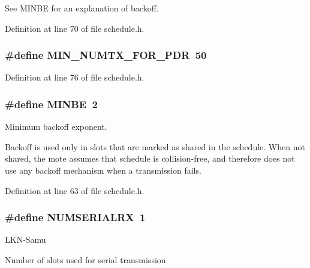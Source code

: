 See M\+I\+N\+BE for an explanation of backoff. 

Definition at line 70 of file schedule.\+h.

\subsubsection[{\texorpdfstring{M\+I\+N\+\_\+\+N\+U\+M\+T\+X\+\_\+\+F\+O\+R\+\_\+\+P\+DR}{MIN_NUMTX_FOR_PDR}}]{\setlength{\rightskip}{0pt plus 5cm}\#define M\+I\+N\+\_\+\+N\+U\+M\+T\+X\+\_\+\+F\+O\+R\+\_\+\+P\+DR~50}\hypertarget{group___schedule_ga9f09f2107f559401598f179a3a8cabe6}{}\label{group___schedule_ga9f09f2107f559401598f179a3a8cabe6}


Definition at line 76 of file schedule.\+h.

\subsubsection[{\texorpdfstring{M\+I\+N\+BE}{MINBE}}]{\setlength{\rightskip}{0pt plus 5cm}\#define M\+I\+N\+BE~2}\hypertarget{group___schedule_ga731698f6cbe05cc416f1116762b2dc49}{}\label{group___schedule_ga731698f6cbe05cc416f1116762b2dc49}


Minimum backoff exponent. 

Backoff is used only in slots that are marked as shared in the schedule. When not shared, the mote assumes that schedule is collision-\/free, and therefore does not use any backoff mechanism when a transmission fails. 

Definition at line 63 of file schedule.\+h.

\subsubsection[{\texorpdfstring{N\+U\+M\+S\+E\+R\+I\+A\+L\+RX}{NUMSERIALRX}}]{\setlength{\rightskip}{0pt plus 5cm}\#define N\+U\+M\+S\+E\+R\+I\+A\+L\+RX~1}\hypertarget{group___schedule_ga5206eabfac75eeed6f5066fb6d00f7c3}{}\label{group___schedule_ga5206eabfac75eeed6f5066fb6d00f7c3}
\begin{DoxyRefDesc}{L\+K\+N-\/\+Samu}
\item[\hyperlink{_l_k_n_code_edits__LKN_code_edits000006}{L\+K\+N-\/\+Samu}]Number of slots used for serial transmission \end{DoxyRefDesc}


